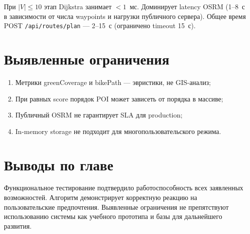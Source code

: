 При $|V| \leq 10$ этап Dijkstra занимает $< 1$~мс. Доминирует latency OSRM
(1--8~с в зависимости от числа waypoints и нагрузки публичного сервера). Общее
время POST \texttt{/api/routes/plan} --- 2--15~с (ограничено timeout 15~с).

\section{Выявленные ограничения}

\begin{enumerate}
  \item Метрики greenCoverage и bikePath --- эвристики, не GIS-анализ;
  \item При равных score порядок POI может зависеть от порядка в массиве;
  \item Публичный OSRM не гарантирует SLA для production;
  \item In-memory storage не подходит для многопользовательского режима.
\end{enumerate}

\section{Выводы по главе}

Функциональное тестирование подтвердило работоспособность всех заявленных
возможностей. Алгоритм демонстрирует корректную реакцию на пользовательские
предпочтения. Выявленные ограничения не препятствуют использованию системы как
учебного прототипа и базы для дальнейшего развития.
